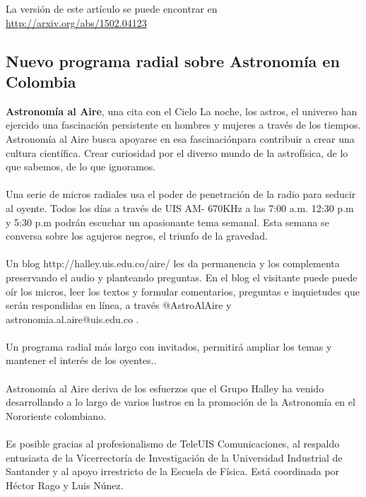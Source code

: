 \documentclass{book}
\begin{document}
La versión de este artículo se puede encontrar en\\
 
\url{http://arxiv.org/abs/1502.04123}

\subsection{Nuevo programa radial sobre Astronomía en Colombia}

\textbf{Astronomía al Aire}, una cita con el Cielo La noche, los astros, el universo han ejercido una fascinación persistente en hombres y mujeres a través de los tiempos. Astronomía al Aire busca apoyarse en esa fascinaciónpara contribuir a crear una cultura científica. Crear curiosidad por el diverso mundo de la astrofísica, de lo que sabemos, de lo que ignoramos.\\
\\
Una serie de micros radiales usa el poder de penetración de la radio para seducir al oyente.  Todos los días a través de  UIS AM- 670KHz a las 7:00 a.m. 12:30 p.m y 5:30 p.m podrán escuchar un apasionante tema semanal. Esta semana se conversa sobre los agujeros negros, el triunfo de la gravedad.\\
\\
Un blog http://halley.uis.edu.co/aire/ les da permanencia y los complementa preservando el audio y planteando preguntas.  En el blog el visitante puede puede oír los micros, leer los textos y formular comentarios, preguntas e inquietudes que serán respondidas en línea, a través @AstroAlAire y astronomia.al.aire@uis.edu.co .\\
\\
Un programa radial más largo con invitados, permitirá ampliar los temas y mantener el interés de los oyentes..\\
\\
Astronomía al Aire deriva de los esfuerzos que el Grupo Halley ha venido desarrollando a lo largo de varios lustros en la promoción de la Astronomía en el Nororiente colombiano.\\
\\
Es posible gracias al profesionalismo de TeleUIS Comunicaciones, al respaldo entusiasta de la Vicerrectoría de Investigación de la Universidad Industrial de Santander y al apoyo irrestricto de la Escuela de Física. Está coordinada por Héctor Rago y Luis Núnez.
\end{document}
